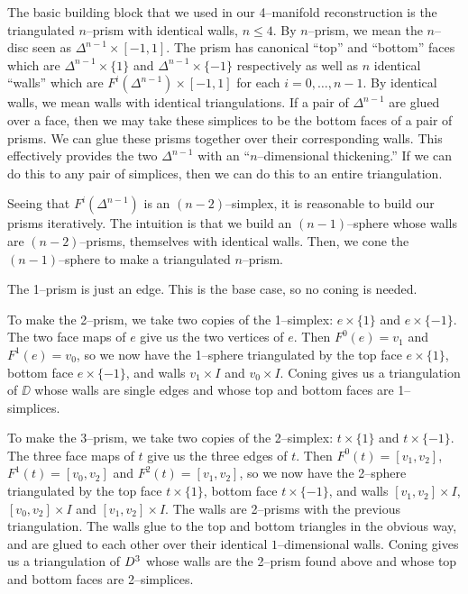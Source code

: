 The basic building block that we used in our 4--manifold reconstruction is the triangulated $n$--prism with identical walls, $n\leq 4$.
By $n$--prism, we mean the $n$--disc seen as $\Delta^{n-1}\times [-1,1]$.
The prism has canonical ``top'' and ``bottom'' faces which are $\Delta^{n-1}\times \{1\}$ and $\Delta^{n-1}\times \{-1\}$ respectively as well as $n$ identical ``walls'' which are $F^i(\Delta^{n-1})\times [-1,1]$ for each $i=0,\dots,n-1$.
By identical walls, we mean walls with identical triangulations.
If a pair of $\Delta^{n-1}$ are glued over a face, then we may take these simplices to be the bottom faces of a pair of prisms.
We can glue these prisms together over their corresponding walls.
This effectively provides the two $\Delta^{n-1}$ with an ``$n$--dimensional thickening.''
If we can do this to any pair of simplices, then we can do this to an entire triangulation.

Seeing that $F^i(\Delta^{n-1})$ is an $(n-2)$--simplex, it is reasonable to build our prisms iteratively.
The intuition is that we build an $(n-1)$--sphere whose walls are $(n-2)$--prisms, themselves with identical walls.
Then, we cone the $(n-1)$--sphere to make a triangulated $n$--prism.

The 1--prism is just an edge.
This is the base case, so no coning is needed.

To make the 2--prism, we take two copies of the 1--simplex: $e\times\{1\}$ and $e\times\{-1\}$.
The two face maps of $e$ give us the two vertices of $e$.
Then $F^0(e)=v_1$ and $F^1(e)=v_0$, so we now have the 1--sphere triangulated by the top face $e\times\{1\}$, bottom face $e\times\{-1\}$, and walls $v_1\times I$ and $v_0\times I$.
Coning gives us a triangulation of $\DD$ whose walls are single edges and whose top and bottom faces are 1--simplices.

To make the 3--prism, we take two copies of the 2--simplex: $t\times\{1\}$ and $t\times\{-1\}$.
The three face maps of $t$ give us the three edges of $t$.
Then $F^0(t)=[v_1,v_2]$, $F^1(t)=[v_0,v_2]$ and $F^2(t)=[v_1,v_2]$, so we now have the 2--sphere triangulated by the top face $t\times\{1\}$, bottom face $t\times\{-1\}$, and walls $[v_1,v_2]\times I$, $[v_0,v_2]\times I$ and $[v_1,v_2]\times I$.
The walls are 2--prisms with the previous triangulation.
The walls glue to the top and bottom triangles in the obvious way, and are glued to each other over their identical $1$--dimensional walls.
Coning gives us a triangulation of $D^3$ whose walls are the 2--prism found above and whose top and bottom faces are 2--simplices.

